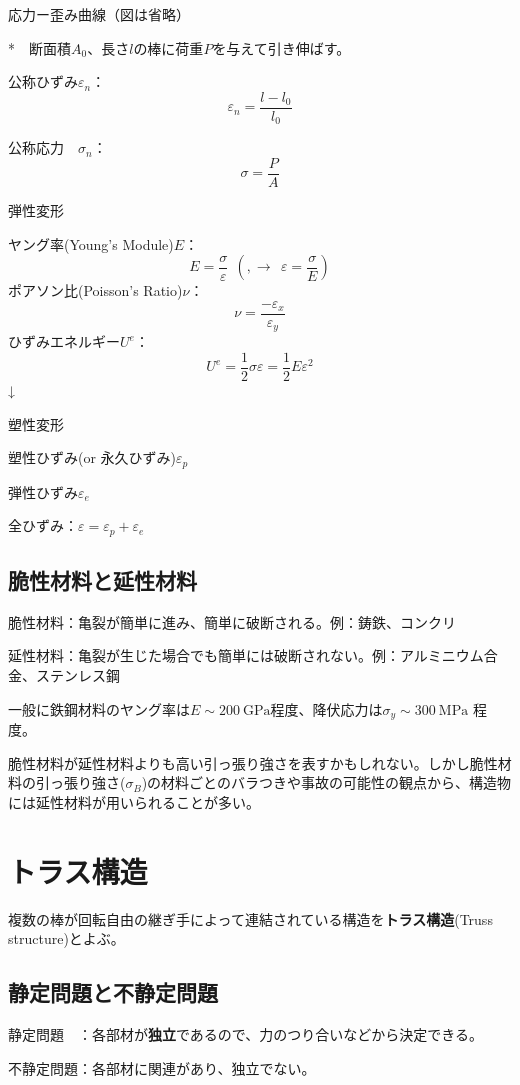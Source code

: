 \documentclass[a4j,10pt,oneside,openany]{jsbook}
\begin{document}
応力ー歪み曲線（図は省略）

*　断面積$A_0$、長さ$l$の棒に荷重$P$を与えて引き伸ばす。

公称ひずみ$\varepsilon_n$：
\[\varepsilon_n = \frac{l-l_0}{l_0}\]

公称応力　$\sigma_n$：
\[\sigma = \frac{P}{A}\]

弾性変形 

ヤング率(Young's Module)$E$：
\[E = \frac{\sigma}{\varepsilon}\ \ \left(, \rightarrow\ \  \varepsilon = \frac{\sigma}{E} \right)\]
ポアソン比(Poisson's Ratio)$\nu$：
\[\nu = \frac{-\varepsilon_x}{\varepsilon_y}\]
ひずみエネルギー$U^e$：
\[U^e = \frac{1}{2} \sigma \varepsilon = \frac{1}{2} E \varepsilon^2\]
↓

塑性変形

塑性ひずみ(or 永久ひずみ)$\varepsilon_p$

弾性ひずみ$\varepsilon_e$

全ひずみ：$\varepsilon = \varepsilon_p + \varepsilon_e$

\subsection{脆性材料と延性材料}
脆性材料：亀裂が簡単に進み、簡単に破断される。例：鋳鉄、コンクリ

延性材料：亀裂が生じた場合でも簡単には破断されない。例：アルミニウム合金、ステンレス鋼

一般に鉄鋼材料のヤング率は$E\sim200\ \mathrm{GPa}$程度、降伏応力は$\sigma_y \sim 300\ \mathrm{MPa}$ 程度。

脆性材料が延性材料よりも高い引っ張り強さを表すかもしれない。しかし脆性材料の引っ張り強さ($\sigma_B$)の材料ごとのバラつきや事故の可能性の観点から、構造物には延性材料が用いられることが多い。

\section{トラス構造}
複数の棒が回転自由の継ぎ手によって連結されている構造を\textbf{トラス構造}(Truss structure)とよぶ。

\subsection{静定問題と不静定問題}
静定問題　：各部材が\textbf{独立}であるので、力のつり合いなどから決定できる。

不静定問題：各部材に関連があり、独立でない。
\newline
\end{document}
